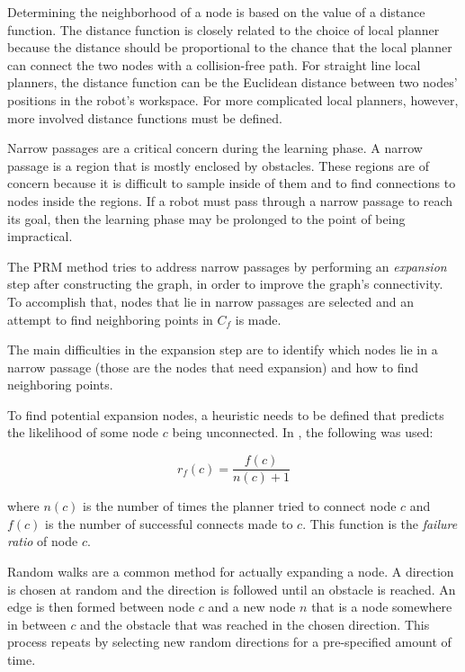 \documentclass[10pt,conference]{ieeeconf}
\begin{document}
Determining the neighborhood of a node is based on the value of a distance function. The distance function is closely related to the choice of local planner because the distance should be proportional to the chance that the local planner can connect the two nodes with a collision-free path. For straight line local planners, the distance function can be the Euclidean distance between two nodes' positions in the robot's workspace. For more complicated local planners, however, more involved distance functions must be defined.  

Narrow passages are a critical concern during the learning phase. A narrow passage is a region that is mostly enclosed by obstacles. These regions are of concern because it is difficult to sample inside of them and to find connections to nodes inside the regions. If a robot must pass through a narrow passage to reach its goal, then the learning phase may be prolonged to the point of being impractical. 

The PRM method tries to address narrow passages by performing an \emph{expansion} step after constructing the graph, in order to improve the graph's connectivity. To accomplish that, nodes that lie in narrow passages are selected and an attempt to find neighboring points in $C_f$ is made. 

The main difficulties in the expansion step are to identify which nodes lie in a narrow passage (those are the nodes that need expansion) and how to find neighboring points.

To find potential expansion nodes, a heuristic needs to be defined that predicts the likelihood of some node $c$ being unconnected. In \cite{PRM}, the following was used:

\begin{equation}
r_f(c) = \frac{f(c)}{n(c)+1}
\end{equation}

where $n(c)$ is the number of times the planner tried to connect node $c$ and $f(c)$ is the number of successful connects made to $c$. This function is the \emph{failure ratio} of node $c$.  

Random walks are a common method for actually expanding a node. A direction is chosen at random and the direction is followed until an obstacle is reached. An edge is then formed between node $c$ and a new node $n$ that is a node somewhere in between $c$ and the obstacle that was reached in the chosen direction. This process repeats by selecting new random directions for a pre-specified amount of time.
\end{document}
